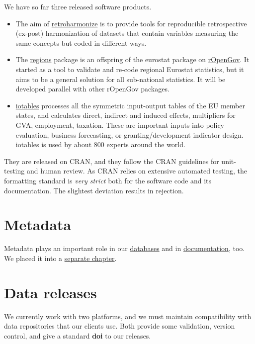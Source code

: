 \documentclass[
  fontsize=13pt,
  english,
  a4paper,
  openany, a4paper, oneside]{book}
\providecommand{\tightlist}{%
  \setlength{\itemsep}{0pt}\setlength{\parskip}{0pt}}
\begin{document}
We have so far three released software products.

\begin{itemize}
\tightlist
\item
  The aim of \href{https://reprex.nl/software/retroharmonize/}{retroharmonize} is to provide tools for reproducible retrospective (ex-post) harmonization of datasets that contain variables measuring the same concepts but coded in different ways.
\item
  The \href{https://reprex.nl/software/regions/}{regions} package is an offspring of the eurostat package on \href{https://github.com/rOpenGov}{rOpenGov}. It started as a tool to validate and re-code regional Eurostat statistics, but it aims to be a general solution for all sub-national statistics. It will be developed parallel with other rOpenGov packages.
\item
  \href{https://reprex.nl/software/iotables/}{iotables} processes all the symmetric input-output tables of the EU member states, and calculates direct, indirect and induced effects, multipliers for GVA, employment, taxation. These are important inputs into policy evaluation, business forecasting, or granting/development indicator design. iotables is used by about 800 experts around the world.
\end{itemize}

They are released on CRAN, and they follow the CRAN guidelines for unit-testing and human review. As CRAN relies on extensive automated testing, the formatting standard is \emph{very strict} both for the software code and its documentation. The slightest deviation results in rejection.

\hypertarget{documentation-metadata}{%
\section{Metadata}\label{documentation-metadata}}

Metadata plays an important role in our \protect\hyperlink{data-storage}{databases} and in \protect\hyperlink{documentation}{documentation}, too. We placed it into a \protect\hyperlink{metadata}{separate chapter}.

\hypertarget{data-release}{%
\section{Data releases}\label{data-release}}

We currently work with two platforms, and we must maintain compatibility with data repositories that our clients use. Both provide some validation, version control, and give a standard \textbf{doi} to our releases.
\end{document}
